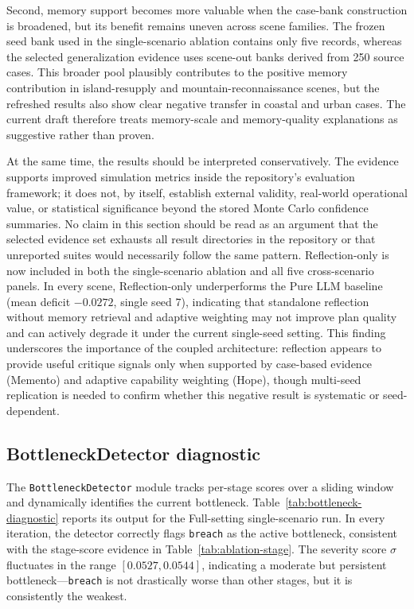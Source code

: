 Second, memory support becomes more valuable when the case-bank construction is broadened, but its benefit remains uneven across scene families. The frozen seed bank used in the single-scenario ablation contains only five records, whereas the selected generalization evidence uses scene-out banks derived from 250 source cases. This broader pool plausibly contributes to the positive memory contribution in island-resupply and mountain-reconnaissance scenes, but the refreshed results also show clear negative transfer in coastal and urban cases. The current draft therefore treats memory-scale and memory-quality explanations as suggestive rather than proven.

At the same time, the results should be interpreted conservatively. The evidence supports improved simulation metrics inside the repository's evaluation framework; it does not, by itself, establish external validity, real-world operational value, or statistical significance beyond the stored Monte Carlo confidence summaries. No claim in this section should be read as an argument that the selected evidence set exhausts all result directories in the repository or that unreported suites would necessarily follow the same pattern. Reflection-only is now included in both the single-scenario ablation and all five cross-scenario panels. In every scene, Reflection-only underperforms the Pure LLM baseline (mean deficit $-0.0272$, single seed 7), indicating that standalone reflection without memory retrieval and adaptive weighting may not improve plan quality and can actively degrade it under the current single-seed setting. This finding underscores the importance of the coupled architecture: reflection appears to provide useful critique signals only when supported by case-based evidence (Memento) and adaptive capability weighting (Hope), though multi-seed replication is needed to confirm whether this negative result is systematic or seed-dependent.

\FloatBarrier
\subsection{BottleneckDetector diagnostic}

The \texttt{BottleneckDetector} module tracks per-stage scores over a sliding window and dynamically identifies the current bottleneck. Table~\ref{tab:bottleneck-diagnostic} reports its output for the Full-setting single-scenario run. In every iteration, the detector correctly flags \texttt{breach} as the active bottleneck, consistent with the stage-score evidence in Table~\ref{tab:ablation-stage}. The severity score $\sigma$ fluctuates in the range $[0.0527, 0.0544]$, indicating a moderate but persistent bottleneck---\texttt{breach} is not drastically worse than other stages, but it is consistently the weakest.

